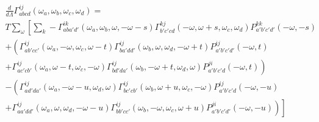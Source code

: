 \documentclass{article}
\begin{document}
\begin{equation}
  \begin{aligned}
  \frac{d}{d\Lambda} \Gamma^{ij}_{abcd}(\omega_a,\omega_b,\omega_c,\omega_d) = \\
  T \sum_\omega \left[ \sum_k -\Gamma^{ik}_{aba'd'}(\omega_a,\omega_b,\omega,-\omega-s)
    \Gamma^{kj}_{b'c'cd}(-\omega,\omega+s,\omega_c,\omega_d)
    P^{kk}_{a'b'c'd'}(-\omega,-s) \right. \\
    + \left( \Gamma^{ij}_{ab'cc'}(\omega_a,-\omega,\omega_c,\omega-t)
    \Gamma^{ij}_{ba'dd'}(\omega_b,\omega,\omega_d,-\omega+t)
    P^{ij}_{a'b'c'd'}(-\omega,t) \right. \\
   \left. + \Gamma^{ij}_{ac'cb'}(\omega_a,\omega-t,\omega_c,-\omega)
   \Gamma^{ij}_{bd'da'}(\omega_b,-\omega+t,\omega_d,\omega)P^{ji}_{a'b'c'd}(-\omega,t) \right) \\
   - \left(\Gamma^{ij}_{ad'da'}(\omega_a,-\omega-u,\omega_d,\omega)
   \Gamma^{ij}_{bc'cb'}(\omega_b,\omega+u,\omega_c,-\omega)
   P^{ij}_{a'b'c'd}(-\omega,-u) \right. \\
   + \left.\left. \Gamma^{ij}_{aa'dd'}(\omega_a,\omega,\omega_d,-\omega-u)
   \Gamma^{ij}_{bb'cc'}(\omega_b,-\omega,\omega_c,\omega+u)
   P^{ji}_{a'b'c'd'}(-\omega,-u) \right)\right] \\
  \end{aligned}
\end{equation}
\end{document}
